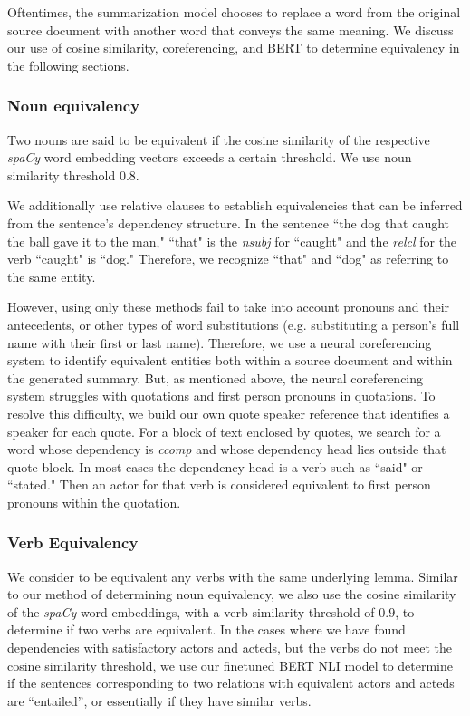 \documentclass{article}
\begin{document}
Oftentimes, the summarization model chooses to replace a word from the original source document with another word that conveys the same meaning. We discuss our use of cosine similarity, coreferencing, and BERT to determine equivalency in the following sections.

\subsubsection{Noun equivalency}
Two nouns are said to be equivalent if the cosine similarity of the respective \textit{spaCy} word embedding vectors exceeds a certain threshold. We use noun similarity threshold $0.8$.

We additionally use relative clauses to establish equivalencies that can be inferred from the sentence's dependency structure. In the sentence ``the dog that caught the ball gave it to the man," ``that" is the \textit{nsubj} for ``caught" and the \textit{relcl} for the verb ``caught" is ``dog." Therefore, we recognize ``that" and ``dog" as referring to the same entity. 

However, using only these methods fail to take into account pronouns and their antecedents, or other types of word substitutions (e.g. substituting a person's full name with their first or last name). Therefore, we use a neural coreferencing system to identify equivalent entities both within a source document and within the generated summary. But, as mentioned above, the neural coreferencing system struggles with quotations and first person pronouns in quotations. To resolve this difficulty, we build our own quote speaker reference that identifies a speaker for each quote. For a block of text enclosed by quotes, we search for a word whose dependency is \textit{ccomp} and whose dependency head lies outside that quote block. In most cases the dependency head is a verb such as ``said" or ``stated." Then an actor for that verb is considered equivalent to first person pronouns within the quotation.

\subsubsection{Verb Equivalency}
We consider to be equivalent any verbs with the same underlying lemma. Similar to our method of determining noun equivalency, we also use the cosine similarity of the \textit{spaCy} word embeddings, with a verb similarity threshold of $0.9$, to determine if two verbs are equivalent. In the cases where we have found dependencies with satisfactory actors and acteds, but the verbs do not meet the cosine similarity threshold, we use our finetuned BERT NLI model to determine if the sentences corresponding to two relations with equivalent actors and acteds are ``entailed'', or essentially if they have similar verbs.
\end{document}
